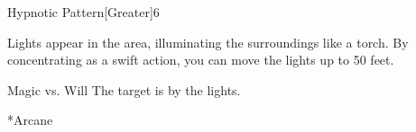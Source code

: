 \begin{spellsection}{Hypnotic Pattern}[Greater]{6}
    \begin{spellheader}
    \end{spellheader}
    \begin{spellcontent}
        \begin{spelltargetinginfo}
        \end{spelltargetinginfo}
        \begin{spelleffects}
            \spelleffect Lights appear in the area, illuminating the surroundings like a torch. By concentrating as a swift action, you can move the lights up to 50 feet.
            \spelldur \durmed
        \end{spelleffects}
    \end{spellcontent}
    \begin{spellsubcontent}
        \begin{spelltargetinginfo}
        \end{spelltargetinginfo}
        \begin{spelleffects}
            \begin{spellattack}{Magic vs. Will}
                \spellsuccess The target is \fascinated by the lights.
            \end{spellattack}
        \end{spelleffects}
    \end{spellsubcontent}
    \begin{spellfooter}
        *{Arcane}
        \miscastyou
    \end{spellfooter}
\end{spellsection}


